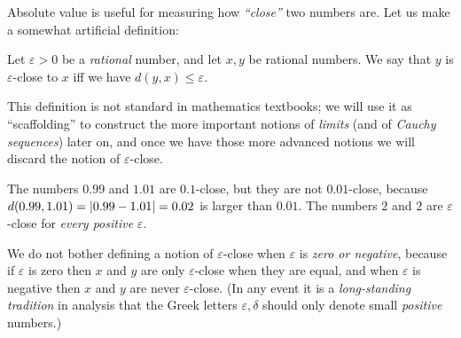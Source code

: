 \begin{note}
Absolute value is useful for measuring how \emph{``close''} two numbers are.
Let us make a somewhat artificial definition:
\end{note}

\begin{definition}  \label{def 4.3.4}
Let \(\varepsilon > 0\) be a \emph{rational} number, and let \(x, y\) be rational numbers.
We say that \(y\) is \(\varepsilon\)-close to \(x\) iff we have \(d(y, x) \le \varepsilon\).
\end{definition}

\begin{remark} \label{remark 4.3.5}
This definition is not standard in mathematics textbooks; we will use it as ``scaffolding'' to construct the more important notions of \emph{limits} (and of \emph{Cauchy sequences}) later on,
and once we have those more advanced notions we will discard the notion of \(\varepsilon\)-close.
\end{remark}

\begin{example} \label {example 4.3.6}
The numbers \(0.99\) and \(1.01\) are \(0.1\)-close, but they are not \(0.01\)-close, because \(d(0.99, 1.01) = \lvert0.99 - 1.01\rvert = 0.02\) is larger than \(0.01\).
The numbers \(2\) and \(2\) are \(\varepsilon\)-close for \emph{every positive} \(\varepsilon\).
\end{example}

\begin{note}
We do not bother defining a notion of \(\varepsilon\)-close when \(\varepsilon\) is \emph{zero or negative},
because if \(\varepsilon\) is zero then \(x\) and \(y\) are only \(\varepsilon\)-close when they are equal,
and when \(\varepsilon\) is negative then \(x\) and \(y\) are never \(\varepsilon\)-close.
(In any event it is a \emph{long-standing tradition} in analysis that the Greek letters \(\varepsilon, \delta\) should only denote small \emph{positive} numbers.)
\end{note}


